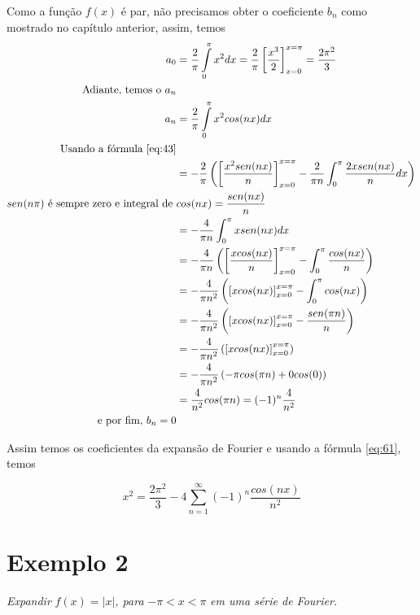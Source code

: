 Como a função $f(x)$ é par, não precisamos obter o coeficiente $b_n$ como mostrado 
no capítulo anterior, assim, temos
\begin{equation}
\notag
\label{eq:exemplo1}
    \begin{split}
        a_0 &= \dfrac{2}{\pi} \int\limits_{0}^{\pi}x^2 dx = \dfrac{2}{\pi}\left[\dfrac{x^3}{2}\right]_{x=0}^{x=\pi} = \dfrac{2\pi^2}{3}\\
        \text{Adiante, temos o }a_n &\\
        a_n &= \dfrac{2}{\pi} \int\limits_{0}^{\pi}x^2 cos(nx) dx\\
        \text{Usando a fórmula \ref{eq:43}}&\\
        &= -\dfrac{2}{\pi}\left( \left[\dfrac{x^2sen(nx)}{n}\right]_{x=0}^{x=\pi} - \dfrac{2}{\pi n}\int_{0}^{\pi}\dfrac{2x sen(nx)}{n}dx \right)\\
        sen(n\pi)\text{ é sempre zero e integral de }& cos(nx) = \dfrac{sen(nx)}{n}\\
        &= -\dfrac{4}{\pi n}\int_{0}^{\pi}x sen(nx)dx \\
        &= -\dfrac{4}{\pi n} \left(\left[\dfrac{x cos(nx)}{n}\right]_{x=0}^{x=\pi} - \int_{0}^{\pi}\dfrac{cos(nx)}{n} \right)\\
        &= -\dfrac{4}{\pi n^2} \left(\left[x cos(nx)\right]_{x=0}^{x=\pi} - \int_{0}^{\pi}cos(nx)\right)\\
        &= -\dfrac{4}{\pi n^2} \left(\left[x cos(nx)\right]_{x=0}^{x=\pi} - \dfrac{sen(\pi n)}{n}\right)\\
        &= -\dfrac{4}{\pi n^2} \left(\left[x cos(nx)\right]_{x=0}^{x=\pi}\right)\\
        &= -\dfrac{4}{\pi n^2} \left( - \pi cos(\pi n) + 0 cos(0) \right)\\
        &= \dfrac{4}{n^2}cos(\pi n) = (-1)^n \dfrac{4}{n^2}\\
        \text{e por fim, }b_n = 0 &
    \end{split}
\end{equation}

Assim temos os coeficientes da expansão de Fourier e usando a fórmula \ref{eq:61}, temos

\begin{equation}
    \label{eq:exemplo1SF}
    x^2 = \dfrac{2\pi^2}{3} - 4\sum\limits_{n=1}^{\infty}(-1)^n \dfrac{cos(nx)}{n^2}
\end{equation}

\section*{Exemplo 2}
\textit{Expandir }$f(x) = |x|$\textit{, para }$-\pi < x < \pi$\textit{ em uma série de Fourier.}\\

